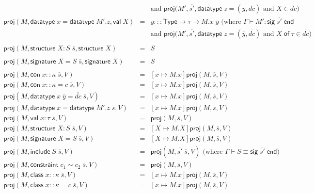 \documentclass{article}
\newcommand{\mt}[1]{\mathsf{#1}}
\begin{document}
\begin{eqnarray*}
  && \textrm{and $\mt{proj}(M', \overline{s'}, \mt{datatype} \; z = (\overline{y}, \overline{dc})$ and $X \in \overline{dc}$)} \\
  \mt{proj}(M, \mt{datatype} \; x = \mt{datatype} \; M'.z, \mt{val} \; X) &=& \overline{y ::: \mt{Type}} \to \tau \to M.x \; \overline y \textrm{ (where $\Gamma \vdash M' : \mt{sig} \; \overline{s'} \; \mt{end}$} \\
  && \textrm{and $\mt{proj}(M', \overline{s'}, \mt{datatype} \; z = (\overline{y}, \overline{dc})$ and $X \; \mt{of} \; \tau \in \overline{dc}$)} \\
  \\
  \mt{proj}(M, \mt{structure} \; X : S \; \overline{s}, \mt{structure} \; X) &=& S \\
  \\
  \mt{proj}(M, \mt{signature} \; X = S \; \overline{s}, \mt{signature} \; X) &=& S \\
  \\
  \mt{proj}(M, \mt{con} \; x :: \kappa \; \overline{s}, V) &=& [x \mapsto M.x]\mt{proj}(M, \overline{s}, V) \\
  \mt{proj}(M, \mt{con} \; x :: \kappa = c \; \overline{s}, V) &=& [x \mapsto M.x]\mt{proj}(M, \overline{s}, V) \\
  \mt{proj}(M, \mt{datatype} \; x \; \overline{y} = \overline{dc} \; \overline{s}, V) &=& [x \mapsto M.x]\mt{proj}(M, \overline{s}, V) \\
  \mt{proj}(M, \mt{datatype} \; x = \mt{datatype} \; M'.z \; \overline{s}, V) &=& [x \mapsto M.x]\mt{proj}(M, \overline{s}, V) \\
  \mt{proj}(M, \mt{val} \; x : \tau \; \overline{s}, V) &=& \mt{proj}(M, \overline{s}, V) \\
  \mt{proj}(M, \mt{structure} \; X : S \; \overline{s}, V) &=& [X \mapsto M.X]\mt{proj}(M, \overline{s}, V) \\
  \mt{proj}(M, \mt{signature} \; X = S \; \overline{s}, V) &=& [X \mapsto M.X]\mt{proj}(M, \overline{s}, V) \\
  \mt{proj}(M, \mt{include} \; S \; \overline{s}, V) &=& \mt{proj}(M, \overline{s'} \; \overline{s}, V) \textrm{ (where $\Gamma \vdash S \equiv \mt{sig} \; \overline{s'} \; \mt{end}$)} \\
  \mt{proj}(M, \mt{constraint} \; c_1 \sim c_2 \; \overline{s}, V) &=& \mt{proj}(M, \overline{s}, V) \\
  \mt{proj}(M, \mt{class} \; x :: \kappa \; \overline{s}, V) &=& [x \mapsto M.x]\mt{proj}(M, \overline{s}, V) \\
  \mt{proj}(M, \mt{class} \; x :: \kappa = c \; \overline{s}, V) &=& [x \mapsto M.x]\mt{proj}(M, \overline{s}, V) \\
\end{eqnarray*}
\end{document}
